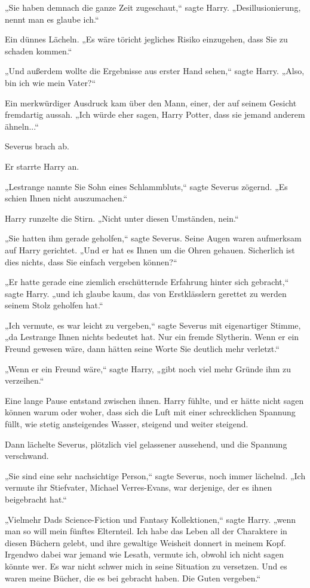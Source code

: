 {„Sie haben demnach die ganze Zeit zugeschaut,“ sagte Harry. „Desillusionierung, nennt man es glaube ich.“

Ein dünnes Lächeln. „Es wäre töricht jegliches Risiko einzugehen, dass Sie zu schaden kommen.“

„Und außerdem wollte die Ergebnisse aus erster Hand sehen,“ sagte Harry. „Also, bin ich wie mein Vater?“

Ein merkwürdiger Ausdruck kam über den Mann, einer, der auf seinem Gesicht fremdartig aussah. „Ich würde eher sagen, Harry Potter, dass sie jemand anderem ähneln...“

Severus brach ab.

Er starrte Harry an.

„Lestrange nannte Sie Sohn eines Schlammbluts,“ sagte Severus zögernd. „Es schien Ihnen nicht auszumachen.“

Harry runzelte die Stirn. „Nicht unter diesen Umständen, nein.“

„Sie hatten ihm gerade geholfen,“ sagte Severus. Seine Augen waren aufmerksam auf Harry gerichtet. „Und er hat es Ihnen um die Ohren gehauen. Sicherlich ist dies nichts, dass Sie einfach vergeben können?“

„Er hatte gerade eine ziemlich erschütternde Erfahrung hinter sich gebracht,“ sagte Harry. „und ich glaube kaum, das von Erstklässlern gerettet zu werden seinem Stolz geholfen hat.“

„Ich vermute, es war leicht zu vergeben,“ sagte Severus mit eigenartiger Stimme, „da Lestrange Ihnen nichts bedeutet hat. Nur ein fremde Slytherin. Wenn er ein Freund gewesen wäre, dann hätten seine Worte Sie deutlich mehr verletzt.“

„Wenn er ein Freund wäre,“ sagte Harry, „gibt noch viel mehr Gründe ihm zu verzeihen.“

Eine lange Pause entstand zwischen ihnen. Harry fühlte, und er hätte nicht sagen können warum oder woher, dass sich die Luft mit einer schrecklichen Spannung füllt, wie stetig ansteigendes Wasser, steigend und weiter steigend.

Dann lächelte Severus, plötzlich viel gelassener aussehend, und die Spannung verschwand.

„Sie sind eine sehr nachsichtige Person,“ sagte Severus, noch immer lächelnd. „Ich vermute ihr Stiefvater, Michael Verres-Evans, war derjenige, der es ihnen beigebracht hat.“

„Vielmehr Dads Science-Fiction und Fantasy Kollektionen,“ sagte Harry. „wenn man so will mein fünftes Elternteil. Ich habe das Leben all der Charaktere in diesen Büchern gelebt, und ihre gewaltige Weisheit donnert in meinem Kopf. Irgendwo dabei war jemand wie Lesath, vermute ich, obwohl ich nicht sagen könnte wer. Es war nicht schwer mich in seine Situation zu versetzen. Und es waren meine Bücher, die es bei gebracht haben. Die Guten vergeben.“

}
